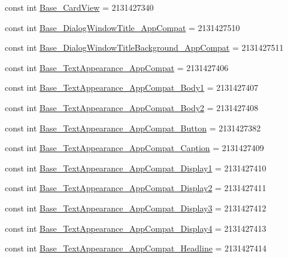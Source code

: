 \begin{CompactItemize}
\item 
const int \hyperlink{class__2doo_1_1_droid_1_1_resource_1_1_style_a8a53def1f1d8ff79e16611b7b2a4332}{Base\_\-CardView} = 2131427340
\item 
const int \hyperlink{class__2doo_1_1_droid_1_1_resource_1_1_style_a7b94f6bfe399257c0fbb703a293ce72}{Base\_\-DialogWindowTitle\_\-AppCompat} = 2131427510
\item 
const int \hyperlink{class__2doo_1_1_droid_1_1_resource_1_1_style_f9ff8861504769f3c17153823b856ddd}{Base\_\-DialogWindowTitleBackground\_\-AppCompat} = 2131427511
\item 
const int \hyperlink{class__2doo_1_1_droid_1_1_resource_1_1_style_5f8701aede71e5d5159e066d236c1aa3}{Base\_\-TextAppearance\_\-AppCompat} = 2131427406
\item 
const int \hyperlink{class__2doo_1_1_droid_1_1_resource_1_1_style_87d741135cf5881998ed623f3fd5cc03}{Base\_\-TextAppearance\_\-AppCompat\_\-Body1} = 2131427407
\item 
const int \hyperlink{class__2doo_1_1_droid_1_1_resource_1_1_style_f5f7d52cbc440bdb275a3d29d84f6e87}{Base\_\-TextAppearance\_\-AppCompat\_\-Body2} = 2131427408
\item 
const int \hyperlink{class__2doo_1_1_droid_1_1_resource_1_1_style_53543de1b7cb88af10eba507bf2b166e}{Base\_\-TextAppearance\_\-AppCompat\_\-Button} = 2131427382
\item 
const int \hyperlink{class__2doo_1_1_droid_1_1_resource_1_1_style_ce5a500eb0b76b04d98b749e3aed68d7}{Base\_\-TextAppearance\_\-AppCompat\_\-Caption} = 2131427409
\item 
const int \hyperlink{class__2doo_1_1_droid_1_1_resource_1_1_style_0886845fe8171cd3560512b2778ce0fd}{Base\_\-TextAppearance\_\-AppCompat\_\-Display1} = 2131427410
\item 
const int \hyperlink{class__2doo_1_1_droid_1_1_resource_1_1_style_57f9ca74fee92bf19645389a1b15061b}{Base\_\-TextAppearance\_\-AppCompat\_\-Display2} = 2131427411
\item 
const int \hyperlink{class__2doo_1_1_droid_1_1_resource_1_1_style_c37e795b4f8d44743eb6e717c55ef72c}{Base\_\-TextAppearance\_\-AppCompat\_\-Display3} = 2131427412
\item 
const int \hyperlink{class__2doo_1_1_droid_1_1_resource_1_1_style_74a5f208224e5bc39a207a628b3a0592}{Base\_\-TextAppearance\_\-AppCompat\_\-Display4} = 2131427413
\item 
const int \hyperlink{class__2doo_1_1_droid_1_1_resource_1_1_style_6b4e9fde042945b6f117c35f5dcca4c6}{Base\_\-TextAppearance\_\-AppCompat\_\-Headline} = 2131427414

\end{CompactItemize}
